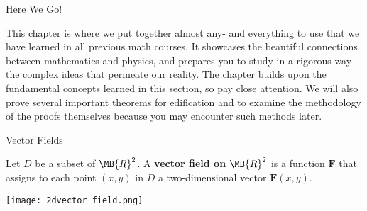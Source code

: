 \documentclass[11pt,english,
handout
]{beamer}
\begin{document}


\makebeamertitle













\begin{frame}{Here We Go!}

This chapter is where we put together almost any- and everything to use that we have learned in all previous math courses. It showcases the beautiful connections between mathematics and physics, and prepares you to study in a rigorous way the complex ideas that permeate our reality. The chapter builds upon the fundamental concepts learned in this section, so pay close attention. We will also prove several important theorems for edification and to examine the methodology of the proofs themselves because you may encounter such methods later.
\end{frame}







\begin{frame}[t]{Vector Fields}
\small

\begin{definition}
Let $D$ be a subset of $\MB{R}^2$. A \textbf{vector field on} $\MB{R}^2$ is a function $\mathbf{F}$ that assigns to each point $(x,y)$ in $D$ a two-dimensional vector $\mathbf{F}(x,y)$.
\end{definition}

\lspace


\begin{center}
\texttt{[image: 2dvector\_field.png]}
\end{center}
\end{frame}
\end{document}
